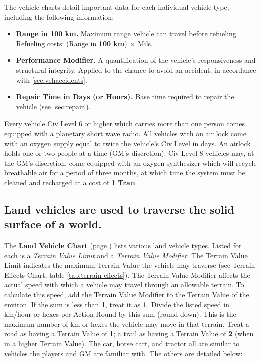 The vehicle charts detail important data for each individual vehicle
type, including the following information:

\begin{itemize}
\item \textbf{Range in 100 km.} Maximum range vehicle can travel
  before refueling. Refueling costs: (Range in \textbf{100 km}) $\times$
  Mils.
\item \textbf{Performance Modifier.} A quantification of the vehicle's
  responsiveness and structural integrity. Applied to the chance to
  avoid an accident, in accordance with \ref{sec:vehaccidents}.
\item \textbf{Repair Time in Days (or Hours).} Base time required to
  repair the vehicle (see \ref{sec:repair}).
\end{itemize}

Every vehicle Civ Level 6 or higher which carries more than one person
comes equipped with a planetary short wave radio. All vehicles with an
air lock come with an oxygen supply equal to twice the vehicle's Civ
Level in days. An airlock holds one or two people at a time (GM's
discretion). Civ Level 8 vehicles may, at the GM's discretion, come
equipped with an oxygen synthesizer which will recycle breathable air
for a period of three months, at which time the system must be cleaned
and recharged at a cost of \textbf{1 Tran}.

\subsection[Land Vehicles]{Land vehicles are used to traverse the
  solid surface of a world.}
\label{sec:land-vehicles}

 The \textbf{Land Vehicle Chart} (page \pageref{tab:land-vehicle}) lists
various land vehicle types. Listed for each is a \emph{Terrain Value Limit}
and a \emph{Terrain Value Modifier}. The Terrain Value Limit indicates the
maximum Terrain Value the vehicle may traverse (see Terrain Effects
Chart, table \vref{tab:terrain-effects}). The Terrain Value Modifier
affects the actual speed with which 
a vehicle may travel through an allowable terrain. To calculate this
speed, add the Terrain Value Modifier to the Terrain Value of the
environ. If the sum is less than \textbf{1}, treat it as \textbf{1}. Divide the listed
speed in km/hour or hexes per Action Round by this sum (round down).
This is the maximum number of km or hexes the vehicle may move in that
terrain. Treat a road as having a Terrain Value of \textbf{1}; a trail as
having a Terrain Value of \textbf{2} (when in a higher Terrain Value). The car,
horse cart, and tractor all are similar to vehicles the players and GM
are familiar with. The others are detailed below:


